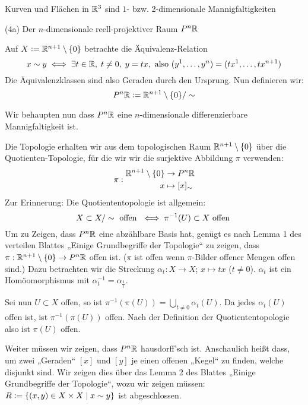 \documentclass[a4paper,twoside,DIV15,BCOR12mm]{scrbook}
\renewcommand{\da}{\mathrel{\DOTSB\mathop:}=}
\begin{document}
\begin{beispiele}
\item Kurven und Flächen in $\mathbb{R}^3$ sind $1$- bzw. 2-dimensionale Mannigfaltigkeiten

\item[(4a)] Der $n$-dimensionale reell-projektiver Raum $P^n\mathbb{R}$
\begin{definition}
Auf $X\da \MdR^{n+1}\setminus\{0\}$ betrachte die Äquivalenz-Relation
\[ x \sim y \iff \exists t \in \mathbb{R},\; t\ne 0,\; y=tx, \text{ also } (y^1,\ldots,y^n) = (tx^1,\ldots,tx^{n+1})\]
Die Äquivalenzklassen sind also Geraden durch den Ursprung. Nun definieren wir:
\[ P^n\MdR \da \MdR^{n+1}\setminus\{0\} / \sim \]
\end{definition}

Wir behaupten nun dass $P^n\mathbb{R}$ eine $n$-dimensionale differenzierbare Mannigfaltigkeit ist.

Die Topologie erhalten wir aus dem topologischen Raum $\mathbb{R}^{n+1}\setminus\{0\}$ über die Quotienten-Topologie, für die wir wir die surjektive Abbildung $\pi$ verwenden:
\[ \pi:
\begin{aligned}
\mathbb{R}^{n+1}\setminus\{0\} &\to P^n\mathbb{R} \\
x &\mapsto [x]_\sim
\end{aligned}
\]
Zur Erinnerung: Die Quotiententopologie ist allgemein: 
\[ X\subset X/\sim\text{ offen } \iff \pi^{-1}(U)\subset X \text{ offen } \]
Um zu Zeigen, dass $P^n\mathbb{R}$ eine abzählbare Basis hat, genügt es nach Lemma 1 des verteilen Blattes „Einige Grundbegriffe der Topologie“ zu zeigen, dass $\pi: \mathbb{R}^{n+1}\setminus\{0\} \to P^n\mathbb{R}$ offen ist. ($\pi$ ist offen wenn $\pi$-Bilder offener Mengen offen sind.) Dazu betrachten wir die Streckung $\alpha_t: X \to X$; $x\mapsto tx$ ($t\ne 0$). $\alpha_t$ ist ein Homöomorphismus mit $\alpha_t^{-1}=\alpha_{\frac 1 t}$.

Sei nun $U\subset X$ offen, so ist $\pi^{-1}(\pi(U)) = \bigcup_{t\ne 0}\alpha_t(U)$. Da jedes $\alpha_t(U)$ offen ist, ist $\pi^{-1}(\pi(U))$ offen. Nach der Definition der Quotiententopologie also ist $\pi(U)$ offen.

Weiter müssen wir zeigen, dass $P^n\mathbb{R}$ hausdorff’sch ist. Anschaulich heißt dass, um zwei „Geraden“ $[x]$ und $[y]$ je einen offenen „Kegel“ zu finden, welche disjunkt sind. Wir zeigen dies über das Lemma 2 des Blattes „Einige Grundbegriffe der Topologie“, wozu wir zeigen müssen:
$ R \da \{ (x,y) \in X \times X \mid x \sim y \} $ ist abgeschlossen.


\end{beispiele}
\end{document}
